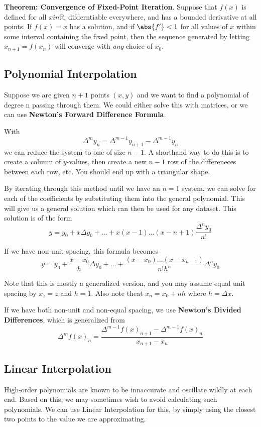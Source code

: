 \documentclass[12pt]{article}
\begin{document}
{\bf Theorem: Convergence of Fixed-Point Iteration}. Suppose that $f(x)$ is defined for all $x in \mathbb{R}$, difderntiable everywhere, and has a bounded derivative at all points. If $f(x) = x$ has a solution, and if $\abs{f^\prime} < 1$ for all values of $x$ within some interval containing the fixed point, then the sequence generated by letting $x_{n+1} = f(x_n)$ will converge with \emph{any} choice of $x_0$.

\subsection*{Polynomial Interpolation}
Suppose we are given $n+1$ points $(x,y)$ and we want to find a polynomial of degree n passing through them. We could either solve this with matrices, or we can use {\bf Newton's Forward Difference Formula}.

With \[ \Delta^m y_n = \Delta^{m-1} y_{n+1} - \Delta^{m-1} y_n \] we can reduce the system to one of size $n-1$. A shorthand way to do this is to create a column of $y$-values, then create a new $n-1$ row of the differeneces between each row, etc. You should end up with a triangular shape.

By iterating through this method until we have an $n = 1$ system, we can solve for each of the coefficients by substituting them into the general polynomial. This will give us a general solution which can then be used for any dataset. This solution is of the form \[ y = y_0 + x\Delta y_0 + ... + x(x - 1)...(x - n + 1)\frac{\Delta^ny_0}{n!} \]

If we have non-unit spacing, this formula becomes \[ y = y_0 + \frac{x - x_0}{h}\Delta y_0 + ... + \frac{(x - x_0)...(x - x_{n-1})}{n!h^n}\Delta^n y_0 \]

Note that this is mostly a generalized version, and you may assume equal unit spacing by $x_z = z$ and $h = 1$. Also note theat $x_n = x_0 + nh$ where $h = \Delta x$.

If we have both non-unit and non-equal spacing, we use {\bf Newton's Divided Differences}, which is generalized from \[ \Delta^m f(x)_n = \frac{\Delta^{m-1} f(x)_{n+1} - \Delta^{m-1} f(x)_n}{x_{n+1} - x_n} \]

\subsection*{Linear Interpolation}
High-order polynomials are known to be innaccurate and oscillate wildly at each end. Based on this, we may sometimes wish to avoid calculating such polynomials. We can use Linear Interpolation for this, by simply using the closest two points to the value we are approximating.
\end{document}
